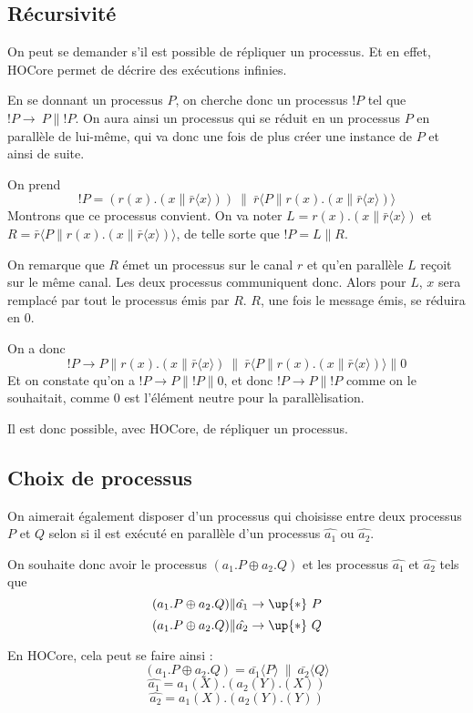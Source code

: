 \documentclass[11pt]{article}
\def\+{\oplus}
\begin{document}
\subsection{Récursivité}

On peut se demander s'il est possible de répliquer un processus. Et en effet, HOCore permet de décrire des exécutions infinies.

En se donnant un processus $P$, on cherche donc un processus $!P$ tel que $!P\rightarrow\ P\|!P$. On aura ainsi un processus qui se réduit en un processus $P$ en parallèle de lui-même, qui va donc une fois de plus créer une instance de $P$ et ainsi de suite.

On prend $$!P = (r(x).(x\|\bar{r}\langle x\rangle))\ \|\ \bar{r}\langle P\|r(x).(x\|\bar{r}\langle x\rangle)\rangle$$
Montrons que ce processus convient. On va noter $L = r(x).(x\|\bar{r}\langle x\rangle)$ et $R = \bar{r}\langle P\|r(x).(x\|\bar{r}\langle x\rangle)\rangle$, de telle sorte que $!P = L\|R$.

On remarque que $R$ émet un processus sur le canal $r$ et qu'en parallèle $L$ reçoit sur le même canal. Les deux processus communiquent donc. Alors pour $L$, $x$ sera remplacé par tout le processus émis par $R$. $R$, une fois le message émis, se réduira en $0$.

On a donc $$!P\rightarrow P\|r(x).(x\|\bar{r}\langle x\rangle)\ \|\ \bar{r}\langle P\|r(x).(x\|\bar{r}\langle x\rangle)\rangle\| 0$$
Et on constate qu'on a $!P\rightarrow P\|!P\|0$, et donc $!P\rightarrow P\|!P$ comme on le souhaitait, comme $0$ est l'élément neutre pour la parallèlisation.

Il est donc possible, avec HOCore, de répliquer un processus.

\subsection{Choix de processus}
On aimerait également disposer d'un processus qui choisisse entre deux processus $P$ et $Q$ selon si il est exécuté en parallèle d'un processus $\hat{a_1}$ ou $\hat{a_2}$.

On souhaite donc avoir le processus $(a_1.P\+ a_2.Q)$ et les processus $\hat{a_1}$ et $\hat{a_2}$ tels que
$$(a_1.P\+ a_2.Q)\|\hat{a_1}\rightarrow\up{*}\ P$$
$$(a_1.P\+ a_2.Q)\|\hat{a_2}\rightarrow\up{*}\ Q$$

En HOCore, cela peut se faire ainsi :
$$(a_1.P\+ a_2.Q) = \bar{a_1}\langle P\rangle\ \|\ \bar{a_2}\langle Q\rangle$$
$$\hat{a_1} = a_1(X).(a_2(Y).(X))$$
$$\hat{a_2} = a_1(X).(a_2(Y).(Y))$$
\end{document}
